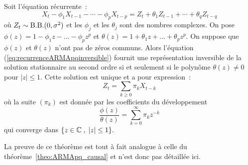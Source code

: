 \begin{theorem}
 \label{theo:ARMAinversible}
Soit l'\'equation r\'ecurrente~:
\begin{equation}
 \label{eq:recurrenceARMApqinversible}
  X_t - \phi_1 X_{t-1} - \cdots - \phi_p X_{t-p}
  =
  Z_t + \theta_1 Z_{t-1} + \cdots + \theta_q Z_{t-q}
\end{equation} o\`u $Z_t \sim \mathrm{B.B.}(0,\sigma^2)$ et les
$\phi_j$ et les $\theta_j$ sont des nombres complexes. On pose
$\phi(z)= 1 - \phi_1 z - \dots - \phi_p z^p$ et $\theta(z)= 1 +
\theta_1 z + \dots + \theta_p z^p$. On suppose que $\phi(z)$ et
$\theta(z)$ n'ont pas de z\'eros communs. Alors l'\'equation
(\ref{eq:recurrenceARMApqinversible}) fournit une repr\'esentation inversible
de la solution stationnaire au second ordre si et seulement si le polyn\^ome $\theta(z)
\neq 0$ pour $|z| \leq 1$. Cette solution est unique et a pour
expression~:
\begin{equation}
 \label{eq:solutionARMApq_inversible}
  Z_t = \sum_{k\geq 0} \pi_k X_{t-k}
\end{equation}
o\`u la suite $(\pi_k)$ est donn\'ee par les coefficients du d\'eveloppement
$$
\frac{\phi(z)}{\theta(z)}=\sum_{k=0}^{\infty} \pi_k z^{-k}
$$
qui converge dans $\{z\in\mathbb{C}\;,\;|z|\leq 1\}.$
\end{theorem}
La preuve de ce th\'eor\`eme est tout \`a fait analogue \`a celle du
th\'eor\`eme~\ref{theo:ARMApq_causal} et n'est donc pas d\'etaill\'ee ici.

